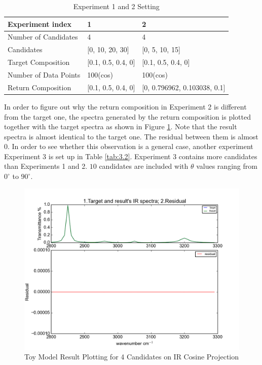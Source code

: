 \begin{table} \label{tab:3.1}
\begin{center}
\begin{tabular}{| l | l | l | }
\hline
Experiment index & 1 & 2  \\
\hline
Number of Candidates & 4 & 4  \\
\hline
Candidates & [0, 10, 20, 30] & [0, 5, 10, 15] \\
\hline
Target Composition & [0.1, 0.5, 0.4, 0] & [0.1, 0.5, 0.4, 0]     \\
\hline
Number of Data Points & 100(cos) &  100(cos)     \\
\hline
Return Composition & [0.1, 0.5, 0.4, 0] & [0, 0.796962, 0.103038, 0.1] \\
\hline
\end{tabular} 
\end{center}
\caption{Experiment 1 and 2 Setting}
\end{table}	

In order to figure out why the return composition in Experiment 2 is different from the target one, the spectra generated by the return composition is plotted together with the target spectra as shown in Figure \ref{fig:3.2}. Note that the result spectra is almost identical to the target one. The residual between them is almost $0$. In order to see whether this observation is a general case, another experiment Experiment 3 is set up in Table \ref{tab:3.2}. Experiment 3 contains more candidates than Experiments 1 and 2. $10$ candidates are included with $\theta$ values ranging from $0^{\circ}$ to $90^{\circ}$.  \\

\begin{figure}[!ht] \label{fig:3.2}
\centering
\includegraphics[scale=0.7]{Figures/toy_model_result_plotting_ir_cos_4candi_1.png}
\caption{Toy Model Result Plotting for 4 Candidates on IR Cosine Projection}
\end{figure}

